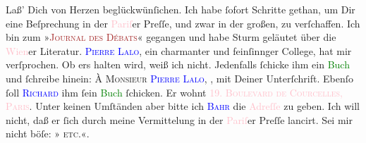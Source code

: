                Laß’ Dich von Herzen beglückwünſichen.\pend
           \pstart
           Ich habe ſofort Schritte gethan, um Dir eine Beſprechung in der \textcolor{pink}{Pariſ}{}\ledrightnote{\textcolor{pink}{Paris}}er Preſſe, und zwar in der großen, zu verſchaffen. Ich bin
               zum »\textsc{\textcolor{brown}{Journal des Débats}{}\ledrightnote{\textcolor{brown}{Journal des débats}}}« gegangen und habe Sturm geläutet über die \textcolor{pink}{Wien}{}\ledrightnote{\textcolor{pink}{Wien}}er Literatur. \textsc{\textcolor{blue}{Pierre Lalo}{}\ledrightnote{\textcolor{blue}{Pierre Lalo}}}, ein charmanter und feinſinnger College, hat mir \label{K_L02622_2v}\label{K_L02622_2h} verſprochen.
               Ob ers halten {\pb}wird, weiß ich nicht. Jedenfalls
               ſchicke ihm ein \textcolor{green}{Buch}{} und
               ſchreibe hinein: \textsc{À Monsieur \textcolor{blue}{Pierre Lalo}{}\ledrightnote{\textcolor{blue}{Pierre Lalo}}}, \textsc{\label{K_L02622_3v}\label{K_L02622_3h}}, mit Deiner Unterſchrift. Ebenſo ſoll \textsc{\textcolor{blue}{Richard}{}\ledrightnote{\textcolor{blue}{Richard Beer-Hofmann}}} ihm ſein \textcolor{green}{Buch}{} ſchicken.
               Er wohnt \textsc{\textcolor{pink}{19. Boulevard de Courcelles, Paris}{}\ledrightnote{\textcolor{pink}{Boulevard de Courcelles}}}. Unter keinen Umſtänden aber bitte ich \textsc{\textcolor{blue}{Bahr}{}\ledrightnote{\textcolor{blue}{Hermann Bahr}}} die \textcolor{pink}{Adreſſe}{} zu geben.
               Ich will nicht, daß er ſich durch meine Vermittelung in der \textcolor{pink}{Pariſ}{}\ledrightnote{\textcolor{pink}{Paris}}er Preſſe lancirt. Sei mir nicht böſe: »\label{K_L02622_4v}\label{K_L02622_4h}{ }\textsc{etc.}«.\pend
